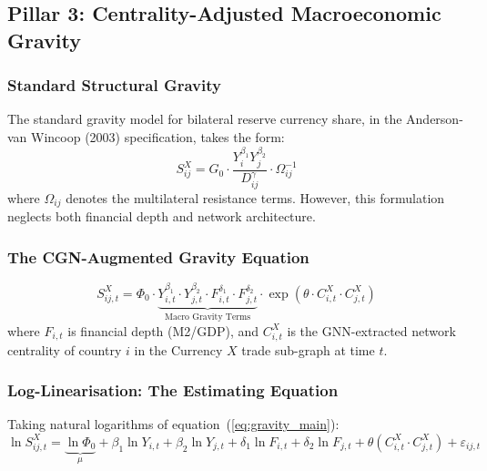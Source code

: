 \documentclass[12pt, letterpaper]{article}
\theoremstyle{definition}
\begin{document}
\subsection{Pillar 3: Centrality-Adjusted Macroeconomic Gravity}

\subsubsection{Standard Structural Gravity}

The standard gravity model for bilateral reserve currency share, in the Anderson-van Wincoop (2003) specification, takes the form:
\[
S_{ij}^X = G_0 \cdot \frac{Y_i^{\beta_1} Y_j^{\beta_2}}{D_{ij}^{\gamma}} \cdot \Omega_{ij}^{-1}
\]
where $\Omega_{ij}$ denotes the multilateral resistance terms. However, this formulation neglects both financial depth and network architecture.

\subsubsection{The CGN-Augmented Gravity Equation}

\begin{modelbox}
\begin{equation}
S_{ij,t}^X = \Phi_0 \cdot \underbrace{Y_{i,t}^{\beta_1} \cdot Y_{j,t}^{\beta_2} \cdot F_{i,t}^{\delta_1} \cdot F_{j,t}^{\delta_2}}_{\text{Macro Gravity Terms}} \cdot \exp\!\left(\theta \cdot C_{i,t}^X \cdot C_{j,t}^X\right)
\label{eq:gravity_main}
\end{equation}
where $F_{i,t}$ is financial depth (M2/GDP), and $C_{i,t}^X$ is the GNN-extracted network centrality of country $i$ in the Currency $X$ trade sub-graph at time $t$.
\end{modelbox}

\subsubsection{Log-Linearisation: The Estimating Equation}

Taking natural logarithms of equation~(\ref{eq:gravity_main}):
\begin{equation}
\ln S_{ij,t}^X = \underbrace{\ln \Phi_0}_{\mu} + \beta_1 \ln Y_{i,t} + \beta_2 \ln Y_{j,t} + \delta_1 \ln F_{i,t} + \delta_2 \ln F_{j,t} + \theta\!\left(C_{i,t}^X \cdot C_{j,t}^X\right) + \varepsilon_{ij,t}
\label{eq:estimating}
\end{equation}
\end{document}
